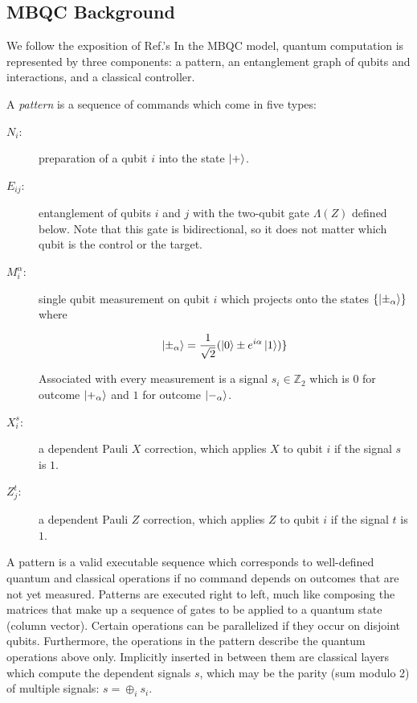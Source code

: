 \subsection{MBQC Background}
\label{subsec:mbqc-bg}

We follow the exposition of Ref.'s \cite{Broadbent2007,DaSilva2013}
In the MBQC model, quantum computation is represented by three components:
a pattern, an entanglement graph of qubits and interactions, and a
classical controller.

A \emph{pattern} is a sequence of commands which come in five types:

\begin{description}
\item[$N_i$:]
preparation of a qubit $i$ into the state $\left\vert{+}\right\rangle$.

\item[$E_{ij}$:]
entanglement of qubits $i$ and $j$ with the two-qubit gate
$\Lambda(Z)$ defined below. Note that this gate is bidirectional, so it
does not matter which qubit is the control or the target.

\item[$M^{\alpha}_i$:] single qubit measurement on qubit $i$ which
projects onto the states
$\{ \left\vert{\pm_{\alpha}}\right\rangle \}$ where

\begin{equation}
\left\vert{\pm_{\alpha}}\right\rangle = \frac{1}{\sqrt{2}}(\left\vert{0}\right\rangle \pm e^{i\alpha}\left\vert{1}\right\rangle)\}
\end{equation}

Associated with every measurement is a signal $s_i \in \mathbb{Z}_2$
which is $0$ for outcome $\left\vert{+_{\alpha}}\right\rangle$ and $1$ for outcome
$\left\vert{-_{\alpha}}\right\rangle$.

\item[$X^{s}_i$:] a dependent Pauli $X$ correction, which applies $X$ to
qubit $i$ if the signal $s$ is $1$.

\item[$Z^{t}_j$:] a dependent Pauli $Z$ correction, which applies $Z$ to
qubit $i$ if the signal $t$ is $1$.

\end{description}

A pattern is a valid executable sequence which corresponds to well-defined
quantum and classical operations if no command depends on outcomes that
are not yet measured. Patterns are executed right to left, much like
composing the matrices that make up a sequence of gates to be applied to
a quantum state (column vector). Certain operations can be parallelized
if they occur on disjoint qubits. Furthermore, the operations in the
pattern describe the quantum operations above only. Implicitly inserted
in between them are classical layers which compute the dependent signals
$s$, which may be the parity
(sum modulo 2) of multiple signals: $s = \oplus_i s_i$.

